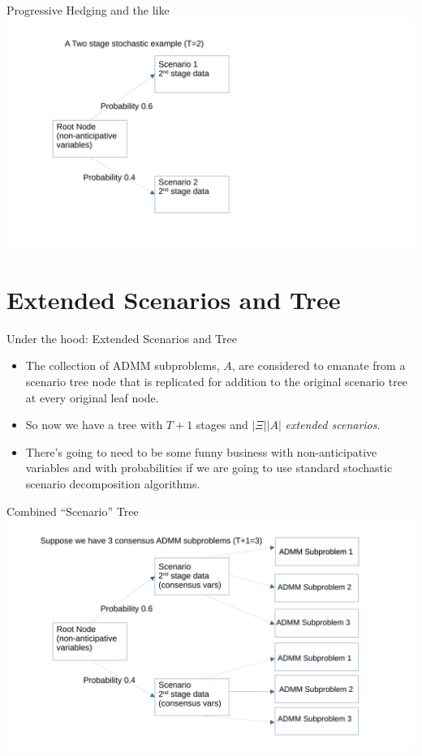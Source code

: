 \documentclass[9pt,usenames,dvipsnames]{beamer}
\begin{document}
\begin{frame}{Progressive Hedging and the like}
\centering
 \includegraphics[width=1.1\linewidth]{tree1.pdf}
\end{frame}

\section{Extended Scenarios and Tree}
\begin{frame}{Under the hood: Extended Scenarios and Tree}
  \begin{itemize}
\item The collection of ADMM subproblems, $A$, are considered to emanate from a scenario tree node that is replicated for addition
  to the original scenario tree at every original leaf node.
\item So now we have a tree with $T+1$ stages and $|\Xi| |A|$ {\em extended scenarios}.
\item There's going to need to be some funny business with non-anticipative variables and with probabilities if we are going to use standard stochastic scenario
  decomposition algorithms.
\end{itemize}
\end{frame}

\begin{frame}{Combined ``Scenario'' Tree}
\centering
 \includegraphics[width=1.1\linewidth]{tree2.pdf}
\end{frame}
\end{document}
